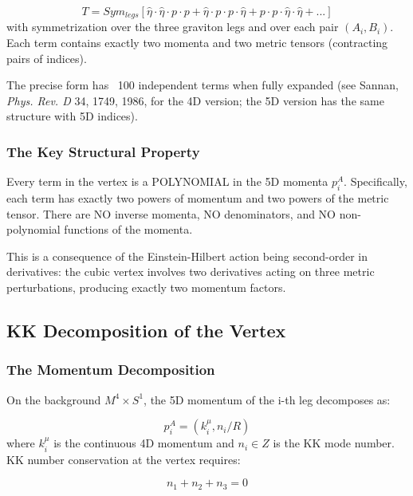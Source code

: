 \documentclass[aps,prd,preprint,superscriptaddress,longbibliography,floatfix]{revtex4-2}
\theoremstyle{remark}
\begin{document}
\begin{equation}
    T = Sym_{legs} [\hat{\eta} \cdot \hat{\eta} \cdot p \cdot p + \hat{\eta} \cdot p \cdot p \cdot \hat{\eta} + p \cdot p \cdot \hat{\eta} \cdot \hat{\eta} + ...]
\end{equation}
with symmetrization over the three graviton legs and over each pair $(A_i, B_i)$. Each term contains exactly two momenta and two metric tensors (contracting pairs of indices).

The precise form has ~100 independent terms when fully expanded (see Sannan, \textit{Phys. Rev. D} 34, 1749, 1986, for the 4D version; the 5D version has the same structure with 5D indices).


\subsubsection{The Key Structural Property}

Every term in the vertex is a POLYNOMIAL in the 5D momenta $p_i^A$. Specifically, each term has exactly two powers of momentum and two powers of the metric tensor. There are NO inverse momenta, NO denominators, and NO non-polynomial functions of the momenta.

This is a consequence of the Einstein-Hilbert action being second-order in derivatives: the cubic vertex involves two derivatives acting on three metric perturbations, producing exactly two momentum factors.



\subsection{KK Decomposition of the Vertex}


\subsubsection{The Momentum Decomposition}

On the background $M^{4} \times S^{1}$, the 5D momentum of the i-th leg decomposes as:


\begin{equation}
    p_i^A = (k_i^\mu, n_i/R)
\end{equation}
where $k_i^\mu$ is the continuous 4D momentum and $n_i \in Z$ is the KK mode number. KK number conservation at the vertex requires:


\begin{equation}
    n_{1} + n_{2} + n_{3} = 0
\end{equation}
\end{document}
